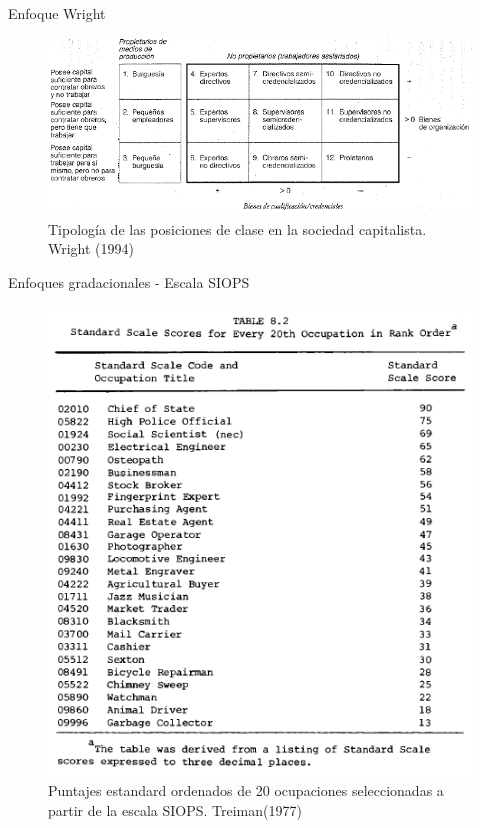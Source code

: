 \documentclass[
  spanish,
  ignorenonframetext,
]{beamer}
\begin{document}
\begin{frame}{Enfoque Wright}
\protect\hypertarget{enfoque-wright}{}
\begin{figure}

{\centering \includegraphics[width=0.85\linewidth]{imagenes/wright1} 

}

\caption{Tipología de las posiciones de clase en la sociedad capitalista. Wright (1994)}\label{fig:unnamed-chunk-2}
\end{figure}
\end{frame}

\begin{frame}{Enfoques gradacionales - Escala SIOPS}
\protect\hypertarget{enfoques-gradacionales---escala-siops}{}
\begin{figure}

{\centering \includegraphics[width=0.5\linewidth]{imagenes/treiman} 

}

\caption{Puntajes estandard ordenados de 20 ocupaciones seleccionadas a partir de la escala SIOPS. Treiman(1977)}\label{fig:unnamed-chunk-3}
\end{figure}
\end{frame}
\end{document}
